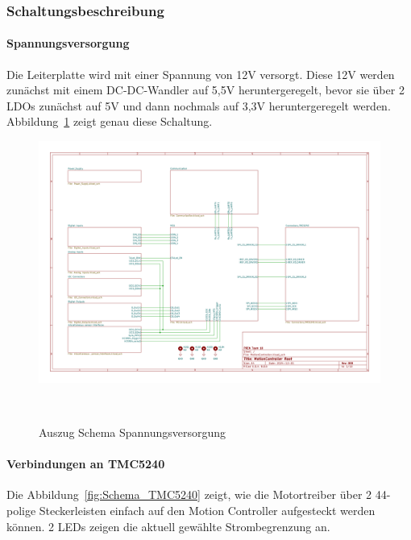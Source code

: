 \documentclass[main.  tex]{subfiles} %
\begin{document}
\subsubsection*{Schaltungsbeschreibung}

\paragraph{Spannungsversorgung}

Die Leiterplatte wird mit einer Spannung von 12V versorgt. Diese 12V werden
zunächst mit einem DC-DC-Wandler auf 5,5V heruntergeregelt, bevor sie über 2
LDOs zunächst auf 5V und dann nochmals auf 3,3V heruntergeregelt werden.
Abbildung~\ref{fig:Schema_Spannungsversorgung} zeigt genau diese Schaltung.

\begin{figure}[h!]
    \centering
    \includegraphics[page=2,width=\textwidth]{../Anhang_pdfs/MotionController.pdf}
    \caption{Auszug Schema Spannungsversorgung}~\label{fig:Schema_Spannungsversorgung}
\end{figure}

\paragraph{Verbindungen an TMC5240}
Die Abbildung~\ref{fig:Schema_TMC5240} zeigt, wie die Motortreiber über 2
44-polige Steckerleisten einfach auf den Motion Controller aufgesteckt werden
können. 2 LEDs zeigen die aktuell gewählte Strombegrenzung an.
\end{document}
